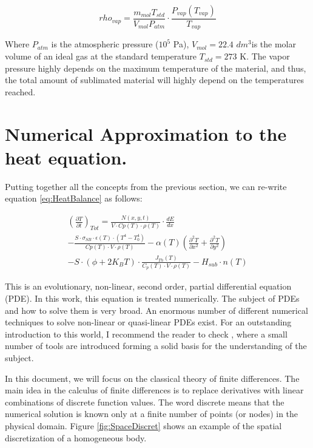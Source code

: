 \begin{equation}
    rho_{vap} = \frac{m_{mol} T_{std}}{V_{mol} P_{atm}}\cdot \frac{P_{vap}(T_{vap})}{T_{vap}}
\end{equation}

Where $P_{atm}$ is the atmospheric pressure ($10^5$ Pa), $V_{mol} = 22.4$ $dm^3$is the molar volume of an ideal gas at the standard temperature $T_{std} = 273$ K. The vapor pressure highly depends on the maximum temperature of the material, and thus, the total amount of sublimated material will highly depend on the temperatures reached. 

\section{Numerical Approximation to the heat equation.}

Putting together all the concepts from the previous section, we can re-write equation \ref{eq:HeatBalance} as follows: 

\begin{multline}
    \left(\frac{\partial T}{\partial t}\right)_{Tot} = 
    \frac{N(x,y,t)}{V\cdot Cp(T) \cdot \rho (T) }\cdot \frac{dE}{dx} \\
    - \frac{S\cdot \sigma_{SB}\cdot \epsilon(T)\cdot \left(T^4 - T_0^4\right)}{Cp(T)\cdot V \cdot \rho(T)} 
        -\alpha (T) \left( \frac{\partial^2 T}{\partial x^2} + \frac{\partial^2 T}{\partial y^2} \right)  \\
        - S\cdot \left( \phi +2K_B T\right)\cdot \frac{J_{Th}(T)}{C_p(T)\cdot V \cdot \rho(T)} - H_{sub} \cdot n(T)
    \label{eq:ExplicitHeatEq}
\end{multline}

This is an evolutionary, non-linear, second order, partial differential equation (PDE). In this work, this equation is treated numerically. The subject of PDEs and how to solve them is very broad. An enormous number of different numerical techniques to solve non-linear or quasi-linear PDEs exist. For an outstanding introduction to this world, I recommend the reader to check \parencite[][]{ref:NumericalMethodBook}, where a small number of tools are introduced forming a solid basis for the understanding of the subject. 

In this document, we will focus on the classical theory of finite differences. The main idea in the calculus of finite differences is to replace derivatives with linear combinations of discrete function values. The word discrete means that the numerical solution is known only at a finite number of points (or nodes) in the physical domain. Figure \ref{fig:SpaceDiscret} shows an example of the spatial discretization of a homogeneous body. 

